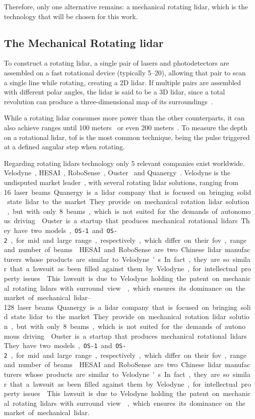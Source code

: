 Therefore, only one alternative remains: a mechanical rotating \ac{lidar}, which is the technology that will be chosen for this work.

\subsection{The Mechanical Rotating \ac{lidar}}
To construct a rotating \ac{lidar}, a single pair of \acp{laser} and photodetectors are assembled on a fast rotational device (typically \SIrange{5}{20}{\revspersecond}), allowing that pair to scan a single line while rotating, creating a 2D \ac{lidar}. If multiple pairs are assembled with different polar angles, the \ac{lidar} is said to be a 3D \ac{lidar}, since a total revolution can produce a three-dimensional map of its surroundings~\cite{Sullivan2016}.

While a rotating \ac{lidar} consumes more power than the other counterparts, it can also achieve ranges until 100 meters~\cite{vlp16, Sullivan2016} or even 200 meters~\cite{VelodyneHDL64, Pandar40UserGuide, Sullivan2016}. To measure the depth on a rotational \ac{lidar}, \ac{tof} is the most common technique, being the pulse triggered at a defined angular step when rotating.

Regarding rotating \acp{lidar} technology only 5 relevant companies exist worldwide. Velodyne\cp~\cite{Velodyne}, HESAI\cp~\cite{Hesai}, RoboSense\cp~\cite{Robosense}, Ouster\cp~\cite{Ouster} and Quanergy\cp~\cite{Quanergy}. Velodyne is the undisputed market leader~\cite{Sullivan2016, Hecht2018}, with several rotating \ac{lidar} solutions, ranging from \SIrange{16}{128} laser beams.

Quanergy is a \ac{lidar} company that is focused on bringing solid state \ac{lidar} to the market. They provide on mechanical rotation \ac{lidar} solution, but with only 8 beams, which is not suited for the demands of autonomous driving~\cite{Sullivan2016, Hecht2018}. 

Ouster is a startup that produces mechanical rotational \acp{lidar}. They have two models, \texttt{OS-1} and \texttt{OS-2}, for mid and large range, respectively, which differ on their \ac{fov}, range and number of beams~\cite{Ouster}.

HESAI and RoboSense are two Chinese \ac{lidar} manufacturers whose products are similar to Velodyne's. In fact, they are so similar that a lawsuit as been filled against them by Velodyne, for intellectual property issues~\cite{VelodyneLawsuit}. This lawsuit is due to Velodyne holding the patent on mechanical rotating \acp{lidar} with surround view\cite{Hall2011}, which ensures its dominance on the market of mechanical \ac{lidar}. 

